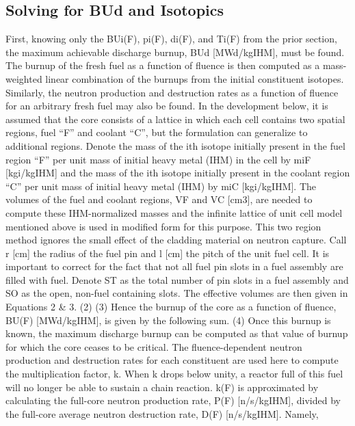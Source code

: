 \subsection{Solving for BUd and Isotopics}
\label{1g_sec:solve_BUd_iso}
First, knowing only the BUi(F), pi(F), di(F), and Ti(F) from the prior section, the maximum achievable discharge burnup, BUd [MWd/kgIHM], must be found.  The burnup of the fresh fuel as a function of fluence is then computed as a mass-weighted linear combination of the burnups from the initial constituent isotopes.  Similarly, the neutron production and destruction rates as a function of fluence for an arbitrary fresh fuel may also be found.  In the development below, it is assumed that the core consists of a lattice in which each cell contains two spatial regions, fuel “F” and coolant “C”, but the formulation can generalize to additional regions.  Denote the mass of the ith isotope initially present in the fuel region “F” per unit mass of initial heavy metal (IHM) in the cell by miF [kgi/kgIHM] and the mass of the ith isotope initially present in the coolant region “C” per unit mass of initial heavy metal (IHM) by miC [kgi/kgIHM].  
The volumes of the fuel and coolant regions, VF and VC [cm3], are needed to compute these IHM-normalized masses and the infinite lattice of unit cell model mentioned above is used in modified form for this purpose.  This two region method ignores the small effect of the cladding material on neutron capture.  Call r [cm] the radius of the fuel pin and l [cm] the pitch of the unit fuel cell.  It is important to correct for the fact that not all fuel pin slots in a fuel assembly are filled with fuel.  Denote ST as the total number of pin slots in a fuel assembly and SO as the open, non-fuel containing slots.  The effective volumes are then given in Equations 2 \& 3.
                                         (2)
                         (3)
Hence the burnup of the core as a function of fluence, BU(F) [MWd/kgIHM], is given by the following sum.
                                (4)
Once this burnup is known, the maximum discharge burnup can be computed as that value of burnup for which the core ceases to be critical.  The fluence-dependent neutron production and destruction rates for each constituent are used here to compute the multiplication factor, k.    When k drops below unity, a reactor full of this fuel will no longer be able to sustain a chain reaction.  k(F) is approximated by calculating the full-core neutron production rate, P(F) [n/s/kgIHM], divided by the full-core average neutron destruction rate, D(F) [n/s/kgIHM].  Namely,
